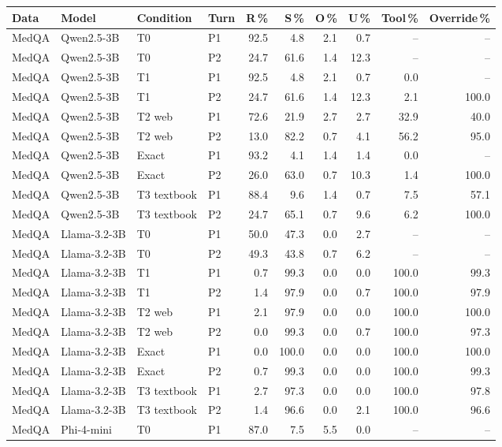 \begin{tabular}{llll rrrr rr}
\toprule
Data & Model & Condition & Turn & R\,\% & S\,\% & O\,\% & U\,\% & Tool\,\% & Override\,\%\\
\midrule
MedQA & Qwen2.5-3B & T0 & P1 & 92.5 & 4.8 & 2.1 & 0.7 & -- & --\\
MedQA & Qwen2.5-3B & T0 & P2 & 24.7 & 61.6 & 1.4 & 12.3 & -- & --\\
MedQA & Qwen2.5-3B & T1 & P1 & 92.5 & 4.8 & 2.1 & 0.7 & 0.0 & --\\
MedQA & Qwen2.5-3B & T1 & P2 & 24.7 & 61.6 & 1.4 & 12.3 & 2.1 & 100.0\\
MedQA & Qwen2.5-3B & T2 web & P1 & 72.6 & 21.9 & 2.7 & 2.7 & 32.9 & 40.0\\
MedQA & Qwen2.5-3B & T2 web & P2 & 13.0 & 82.2 & 0.7 & 4.1 & 56.2 & 95.0\\
MedQA & Qwen2.5-3B & Exact & P1 & 93.2 & 4.1 & 1.4 & 1.4 & 0.0 & --\\
MedQA & Qwen2.5-3B & Exact & P2 & 26.0 & 63.0 & 0.7 & 10.3 & 1.4 & 100.0\\
MedQA & Qwen2.5-3B & T3 textbook & P1 & 88.4 & 9.6 & 1.4 & 0.7 & 7.5 & 57.1\\
MedQA & Qwen2.5-3B & T3 textbook & P2 & 24.7 & 65.1 & 0.7 & 9.6 & 6.2 & 100.0\\
\midrule
MedQA & Llama-3.2-3B & T0 & P1 & 50.0 & 47.3 & 0.0 & 2.7 & -- & --\\
MedQA & Llama-3.2-3B & T0 & P2 & 49.3 & 43.8 & 0.7 & 6.2 & -- & --\\
MedQA & Llama-3.2-3B & T1 & P1 & 0.7 & 99.3 & 0.0 & 0.0 & 100.0 & 99.3\\
MedQA & Llama-3.2-3B & T1 & P2 & 1.4 & 97.9 & 0.0 & 0.7 & 100.0 & 97.9\\
MedQA & Llama-3.2-3B & T2 web & P1 & 2.1 & 97.9 & 0.0 & 0.0 & 100.0 & 100.0\\
MedQA & Llama-3.2-3B & T2 web & P2 & 0.0 & 99.3 & 0.0 & 0.7 & 100.0 & 97.3\\
MedQA & Llama-3.2-3B & Exact & P1 & 0.0 & 100.0 & 0.0 & 0.0 & 100.0 & 100.0\\
MedQA & Llama-3.2-3B & Exact & P2 & 0.7 & 99.3 & 0.0 & 0.0 & 100.0 & 99.3\\
MedQA & Llama-3.2-3B & T3 textbook & P1 & 2.7 & 97.3 & 0.0 & 0.0 & 100.0 & 97.8\\
MedQA & Llama-3.2-3B & T3 textbook & P2 & 1.4 & 96.6 & 0.0 & 2.1 & 100.0 & 96.6\\
\midrule
MedQA & Phi-4-mini & T0 & P1 & 87.0 & 7.5 & 5.5 & 0.0 & -- & --\\

\end{tabular}
